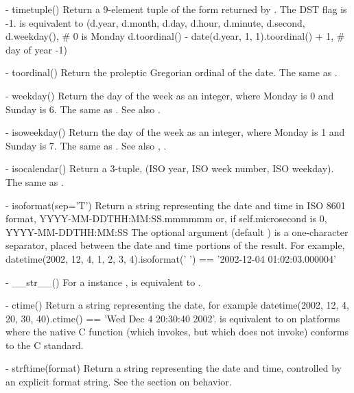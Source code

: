   - timetuple()
    Return a 9-element tuple of the form returned by
    .
    The DST flag is -1.    is equivalent to
        (d.year, d.month, d.day,
         d.hour, d.minute, d.second,
         d.weekday(),  \# 0 is Monday
         d.toordinal() - date(d.year, 1, 1).toordinal() + 1, \# day of year
         -1)

  - toordinal()
    Return the proleptic Gregorian ordinal of the date.  The same as
    .

  - weekday()
    Return the day of the week as an integer, where Monday is 0 and
    Sunday is 6.  The same as .
    See also .

  - isoweekday()
    Return the day of the week as an integer, where Monday is 1 and
    Sunday is 7.  The same as .
    See also , .

  - isocalendar()
    Return a 3-tuple, (ISO year, ISO week number, ISO weekday).  The
    same as .

  - isoformat(sep='T')
    Return a string representing the date and time in ISO 8601 format,
        YYYY-MM-DDTHH:MM:SS.mmmmmm
    or, if self.microsecond is 0,
        YYYY-MM-DDTHH:MM:SS
    The optional argument  (default ) is a
    one-character separator, placed between the date and time portions
    of the result.  For example,
        datetime(2002, 12, 4, 1, 2, 3, 4).isoformat(' ') ==
        '2002-12-04 01:02:03.000004'

  - __str__()
    For a  instance ,  is
    equivalent to .

  - ctime()
    Return a string representing the date, for example
    datetime(2002, 12, 4, 20, 30, 40).ctime() == 'Wed Dec  4 20:30:40 2002'.
     is equivalent to
     on platforms where
    the native C  function (which
     invokes, but which
     does not invoke) conforms to the C
    standard.

  - strftime(format)
    Return a string representing the date and time, controlled by an
    explicit format string.  See the section on 
    behavior.


\subsection{ \label{datetime-time}}

